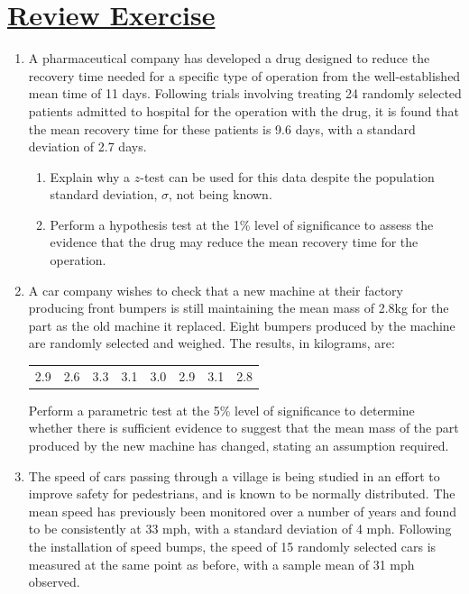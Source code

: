 \documentclass[
  11pt,
]{book}
\begin{document}
\pagebreak

\label{re10q}{}

\section*{\texorpdfstring{\hyperref[re10a]{Review Exercise}}{Review Exercise}}\label{review-exercise-9}

\begin{enumerate}
    \item A pharmaceutical company has developed a drug designed to reduce the recovery time needed for a specific type of operation from the well-established mean time of 11 days. Following trials involving treating 24 randomly selected patients admitted to hospital for the operation with the drug, it is found that the mean recovery time for these patients is 9.6 days, with a standard deviation of 2.7 days.
    \begin{enumerate}
        \item Explain why a $z$-test can be used for this data despite the population standard deviation, $\sigma$, not being known.
        \item Perform a hypothesis test at the 1\% level of significance to assess the evidence that the drug may reduce the mean recovery time for the operation.
    \end{enumerate}
    \item A car company wishes to check that a new machine at their factory producing front bumpers is still maintaining the mean mass of 2.8kg for the part as the old machine it replaced. Eight bumpers produced by the machine are randomly selected and weighed. The results, in kilograms, are:
    \begin{center}
    \begin{tabular}{c c c c c c c c} 
      2.9 & 2.6 & 3.3 & 3.1 & 3.0 & 2.9 & 3.1 & 2.8\\ 
    \end{tabular}
    \end{center}
    Perform a parametric test at the 5\% level of significance to determine whether there is sufficient evidence to suggest that the mean mass of the part produced by the new machine has changed, stating an assumption required.
    \item The speed of cars passing through a village is being studied in an effort to improve safety for pedestrians, and is known to be normally distributed. The mean speed has previously been monitored over a number of years and found to be consistently at 33 mph, with a standard deviation of 4 mph. Following the installation of speed bumps, the speed of 15 randomly selected cars is measured at the same point as before, with a sample mean of 31 mph observed. 

\end{enumerate}
\end{document}
